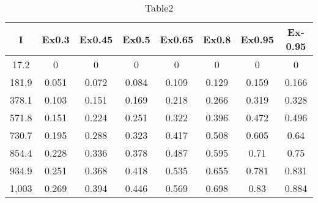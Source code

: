 \begin{table} 
 \caption{Table2}
\begin{tabular}{|*{8}{c|}}
\hline 
I & Ex0.3 & Ex0.45 & Ex0.5 & Ex0.65 & Ex0.8 & Ex0.95 & Ex-0.95\\ \hline 
17.2 & 0 & 0 & 0 & 0 & 0 & 0 & 0 \\ \hline 
 181.9 & 0.051 & 0.072 & 0.084 & 0.109 & 0.129 & 0.159 & 0.166 \\ \hline 
 378.1 & 0.103 & 0.151 & 0.169 & 0.218 & 0.266 & 0.319 & 0.328 \\ \hline 
 571.8 & 0.151 & 0.224 & 0.251 & 0.322 & 0.396 & 0.472 & 0.496 \\ \hline 
 730.7 & 0.195 & 0.288 & 0.323 & 0.417 & 0.508 & 0.605 & 0.64 \\ \hline 
 854.4 & 0.228 & 0.336 & 0.378 & 0.487 & 0.595 & 0.71 & 0.75 \\ \hline 
 934.9 & 0.251 & 0.368 & 0.418 & 0.535 & 0.655 & 0.781 & 0.831 \\ \hline 
 1,003 & 0.269 & 0.394 & 0.446 & 0.569 & 0.698 & 0.83 & 0.884 \\ \hline 
 \end{tabular} 
\end{table} 
